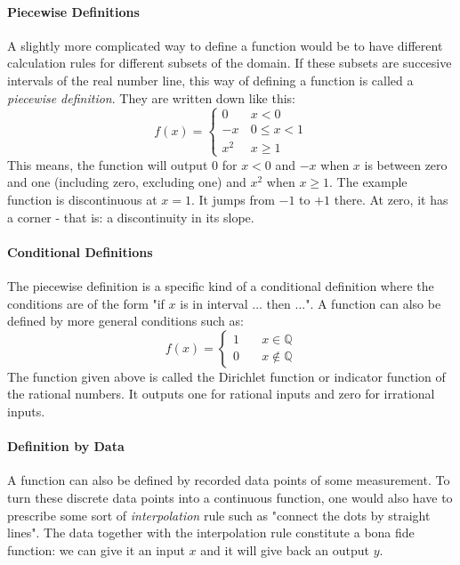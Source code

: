 \paragraph{Piecewise Definitions}
A slightly more complicated way to define a function would be to have different calculation rules for different subsets of the domain. If these subsets are succesive intervals of the real number line, this way of defining a function is called a \emph{piecewise definition}. They are written down like this:
\begin{equation}
f(x) = 
\begin{cases} 
 0 \quad& x < 0 \\
 -x     & 0   \leq x < 1 \\
 x^2    & x \geq 1
\end{cases}
\end{equation}
This means, the function will output $0$ for $x < 0$ and $-x$ when $x$ is between zero and one (including zero, excluding one) and $x^2$ when $x \geq 1$. The example function is discontinuous at $x=1$. It jumps from $-1$ to $+1$ there. At zero, it has a corner - that is: a discontinuity in its slope.

\paragraph{Conditional Definitions}
The piecewise definition is a specific kind of a conditional definition where the conditions are of the form "if $x$ is in interval ... then ...". A function can also be defined by more general conditions such as:
\begin{equation}
f(x) = 
\begin{cases} 
 1 \quad& x \in    \mathbb{Q} \\
 0      & x \notin \mathbb{Q}
\end{cases}
\end{equation}
The function given above is called the Dirichlet function or indicator function of the rational numbers. It outputs one for rational inputs and zero for irrational inputs.

\paragraph{Definition by Data}
A function can also be defined by recorded data points of some measurement. To turn these discrete data points into a continuous function, one would also have to prescribe some sort of \emph{interpolation} rule such as "connect the dots by straight lines". The data together with the interpolation rule constitute a bona fide function: we can give it an input $x$ and it will give back an output $y$. 

